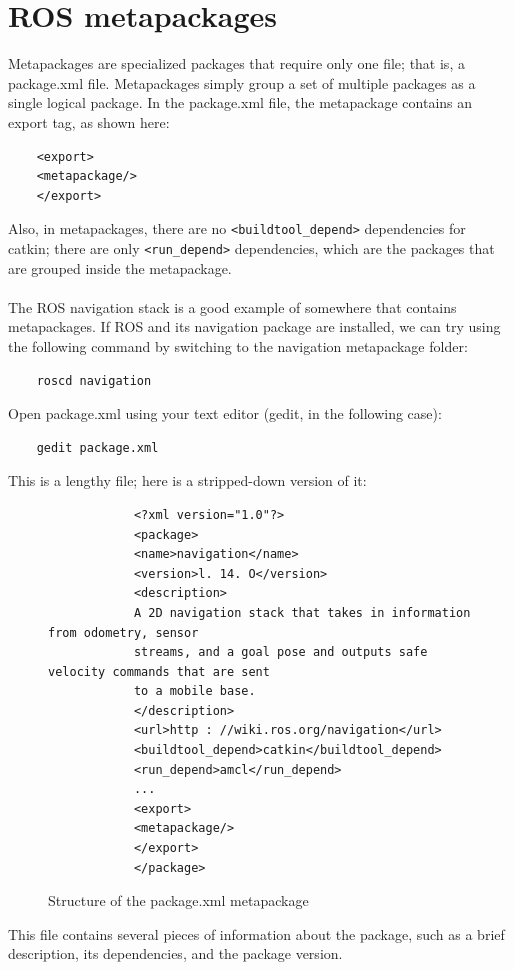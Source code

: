 \documentclass[../../main]{subfiles}
\begin{document}
\section{ROS metapackages}
Metapackages are specialized packages that require only one file; that is, a package.xml
file.
Metapackages simply group a set of multiple packages as a single logical package. In the
package.xml file, the metapackage contains an export tag, as shown here:
\begin{verbatim}
    <export>
    <metapackage/>
    </export>
\end{verbatim}
Also, in metapackages, there are no \texttt{<buildtool\_depend>} dependencies for catkin;
there are only \texttt{<run\_depend>} dependencies, which are the packages that are grouped
inside the metapackage.\\
\\
The ROS navigation stack is a good example of somewhere that contains metapackages. If
ROS and its navigation package are installed, we can try using the following command by
switching to the navigation metapackage folder:
\begin{verbatim}
    roscd navigation
    \end{verbatim}
    Open package.xml using your text editor (gedit, in the following case):
    \begin{verbatim}
    gedit package.xml
        \end{verbatim}
    \newpage
        This is a lengthy file; here is a stripped-down version of it:
\begin{figure}[ht]
        \begin{verbatim}
            <?xml version="1.0"?>
            <package>
            <name>navigation</name>
            <version>l. 14. O</version>
            <description>
            A 2D navigation stack that takes in information from odometry, sensor
            streams, and a goal pose and outputs safe velocity commands that are sent
            to a mobile base.
            </description>
            <url>http : //wiki.ros.org/navigation</url>
            <buildtool_depend>catkin</buildtool_depend>
            <run_depend>amcl</run_depend>
            ...
            <export>
            <metapackage/>
            </export>
            </package>
        \end{verbatim}
        \caption{Structure of the package.xml metapackage}
    \end{figure}
    This file contains several pieces of information about the package, such as a brief
description, its dependencies, and the package version.
\end{document}
